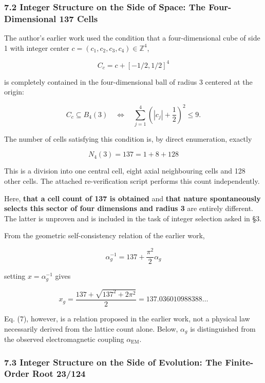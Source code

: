 \documentclass[
  a4paper,
]{article}
\begin{document}
\subsubsection{7.2 Integer Structure on the Side of Space: The
Four-Dimensional 137
Cells}\label{integer-structure-on-the-side-of-space-the-four-dimensional-137-cells}

The author's earlier work used the condition that a four-dimensional
cube of side 1 with integer center
\(c=(c_1,c_2,c_3,c_4)\in\mathbb Z^4\),

\[
C_c=c+[-1/2,1/2]^4
\]

is completely contained in the four-dimensional ball of radius 3
centered at the origin:

\[
C_c\subseteq B_4(3)
\quad\Longleftrightarrow\quad
\sum_{j=1}^4\left(|c_j|+\frac12\right)^2\le9.
\tag{5}
\]

The number of cells satisfying this condition is, by direct enumeration,
exactly

\[
\boxed{N_4(3)=137=1+8+128}
\tag{6}
\]

This is a division into one central cell, eight axial neighbouring cells
and 128 other cells. The attached re-verification script performs this
count independently.

Here, \textbf{that a cell count of 137 is obtained} and \textbf{that
nature spontaneously selects this sector of four dimensions and radius
3} are entirely different. The latter is unproven and is included in the
task of integer selection asked in §3.

From the geometric self-consistency relation of the earlier work,

\[
\alpha_g^{-1}=137+\frac{\pi^2}{2}\alpha_g
\tag{7}
\]

setting \(x=\alpha_g^{-1}\) gives

\[
x_g=\frac{137+\sqrt{137^2+2\pi^2}}{2}
=137.036010988388\ldots
\tag{8}
\]

Eq. (7), however, is a relation proposed in the earlier work, not a
physical law necessarily derived from the lattice count alone. Below,
\(\alpha_g\) is distinguished from the observed electromagnetic coupling
\(\alpha_{\mathrm{EM}}\).

\subsubsection{7.3 Integer Structure on the Side of Evolution: The
Finite-Order Root
23/124}\label{integer-structure-on-the-side-of-evolution-the-finite-order-root-23124}
\end{document}
